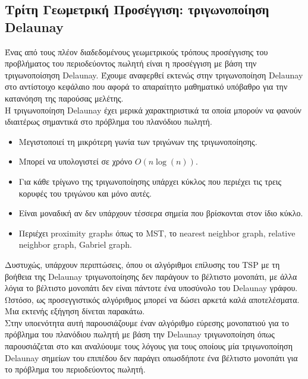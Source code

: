 \documentclass[oneside,12pt]{book}
\theoremstyle{definition}
\begin{document}
\subsection{Τρίτη Γεωμετρική Προσέγγιση: τριγωνοποίηση Delaunay}

Ένας από τους πλέον διαδεδομένους γεωμετρικούς τρόπους προσέγγισης του προβλήματος του περιοδεύοντος πωλητή είναι η προσέγγιση με βάση την τριγωνοποίσηση Delaunay. Έχουμε αναφερθεί εκτενώς στην τριγωνοποίηση Delaunay στο αντίστοιχο κεφάλαιο που αφορά το απαραίτητο μαθηματικό υπόβαθρο για την κατανόηση της παρούσας μελέτης. \\

Η τριγωνοποίηση Delaunay έχει μερικά χαρακτηριστικά τα οποία μπορούν να φανούν ιδιαιτέρως σημαντικά στο πρόβλημα του πλανόδιου πωλητή.

\begin{itemize}
	\item Μεγιστοποιεί τη μικρότερη γωνία των τριγώνων της τριγωνοποίησης.
	\item Μπορεί να υπολογιστεί σε χρόνο \(Ο(n \log(n))\).
	\item Για κάθε τρίγωνο της τριγωνοποίησης υπάρχει κύκλος που περιέχει τις τρεις κορυφές του τριγώνου και μόνο αυτές.
	\item Είναι μοναδική αν δεν υπάρχουν τέσσερα σημεία που βρίσκονται στον ίδιο κύκλο.
	\item Περιέχει proximity graphs όπως το MST, το nearest neighbor graph, relative neighbor graph, Gabriel graph.
\end{itemize}

Δυστυχώς, υπάρχουν περιπτώσεις, όπου οι αλγόριθμοι επίλυσης του TSP με τη βοήθεια της Delaunay τριγωνοποίησης δεν παράγουν το βέλτιστο μονοπάτι, με άλλα λόγια το βέλτιστο μονοπάτι δεν είναι πάντοτε ένα υποσύνολο του Delaunay γράφου. Ωστόσο, ως προσεγγιστικός αλγόριθμος μπορεί να δώσει αρκετά καλά αποτελέσματα. Μια εκτενής εξήγηση δίνεται παρακάτω. \\

Στην υποενότητα αυτή παρουσιάζουμε έναν αλγόριθμο εύρεσης μονοπατιού για το πρόβλημα του πλανόδιου πωλητή με βάση την Delaunay τριγωνοποίηση όπως παρουσιάζεται στο \cite{10} και αναλύουμε τους λόγους για τους οποίους μία τριγωνοποίηση Delaunay σημείων του επιπέδου δεν παράγει οπωσδήποτε ένα βέλτιστο μονοπάτι για το πρόβλημα του περιοδεύοντος πωλητή. \\
\end{document}
